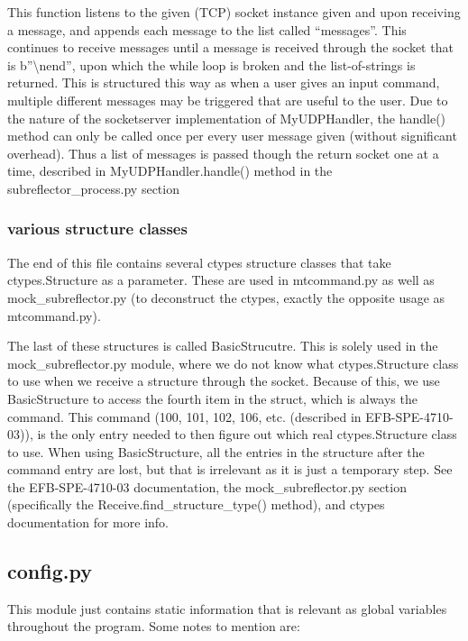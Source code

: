 \documentclass{article}
\begin{document}
This function listens to the given (TCP) socket instance given and upon receiving a message, and appends each message to the list called ``messages''. This continues to receive messages until a message is received through the socket that is b''\textbackslash nend'', upon which the while loop is broken and the list-of-strings is returned. This is structured this way as when a user gives an input command, multiple different messages may be triggered that are useful to the user. Due to the nature of the socketserver implementation of MyUDPHandler, the handle() method can only be called once per every user message given (without significant overhead). Thus a list of messages is passed though the return socket one at a time, described in MyUDPHandler.handle() method in the subreflector\_process.py section


\subsubsection{various structure classes}
The end of this file contains several ctypes structure classes that take ctypes.Structure as a parameter. These are used in mtcommand.py as well as mock\_subreflector.py (to deconstruct the ctypes, exactly the opposite usage as mtcommand.py). 

\vspace{10pt}

The last of these structures is called BasicStrucutre. This is solely used in the mock\_subreflector.py module, where we do not know what ctypes.Structure class to use when we receive a structure through the socket. Because of this, we use BasicStructure to access the fourth item in the struct, which is always the command. This command  (100, 101, 102, 106, etc. (described in EFB-SPE-4710-03)), is the only entry needed to then figure out which real ctypes.Structure class to use. When using BasicStructure, all the entries in the structure after the command entry are lost, but that is irrelevant as it is just a temporary step. See the EFB-SPE-4710-03 documentation, the mock\_subreflector.py section (specifically the Receive.find\_structure\_type() method), and ctypes documentation for more info.



\subsection{config.py}

This module just contains static information that is relevant as global variables throughout the program. Some notes to mention are:
\end{document}
